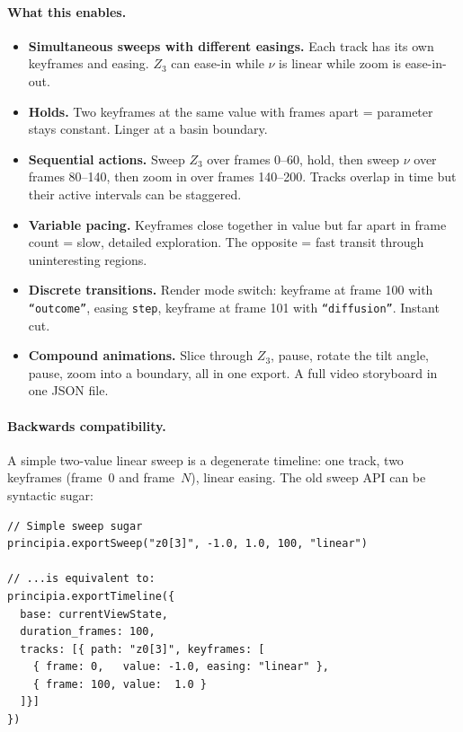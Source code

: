 \documentclass[11pt]{report}
\begin{document}
\paragraph{What this enables.}
\begin{itemize}[nosep]
\item \textbf{Simultaneous sweeps with different easings.} Each track has its own keyframes and easing. $Z_3$ can ease-in while $\nu$ is linear while zoom is ease-in-out.
\item \textbf{Holds.} Two keyframes at the same value with frames apart = parameter stays constant. Linger at a basin boundary.
\item \textbf{Sequential actions.} Sweep $Z_3$ over frames 0--60, hold, then sweep $\nu$ over frames 80--140, then zoom in over frames 140--200. Tracks overlap in time but their active intervals can be staggered.
\item \textbf{Variable pacing.} Keyframes close together in value but far apart in frame count = slow, detailed exploration. The opposite = fast transit through uninteresting regions.
\item \textbf{Discrete transitions.} Render mode switch: keyframe at frame 100 with \texttt{``outcome''}, easing \texttt{step}, keyframe at frame 101 with \texttt{``diffusion''}. Instant cut.
\item \textbf{Compound animations.} Slice through $Z_3$, pause, rotate the tilt angle, pause, zoom into a boundary, all in one export. A full video storyboard in one JSON file.
\end{itemize}

\paragraph{Backwards compatibility.} A simple two-value linear sweep is a degenerate timeline: one track, two keyframes (frame~0 and frame~$N$), linear easing. The old sweep API can be syntactic sugar:
\begin{verbatim}
// Simple sweep sugar
principia.exportSweep("z0[3]", -1.0, 1.0, 100, "linear")

// ...is equivalent to:
principia.exportTimeline({
  base: currentViewState,
  duration_frames: 100,
  tracks: [{ path: "z0[3]", keyframes: [
    { frame: 0,   value: -1.0, easing: "linear" },
    { frame: 100, value:  1.0 }
  ]}]
})
\end{verbatim}
\end{document}
